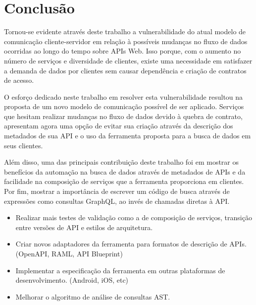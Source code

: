 \chapter{Conclusão}

Tornou-se evidente através deste trabalho a vulnerabilidade do atual modelo de comunicação cliente-servidor em relação à possíveis mudanças no fluxo de dados ocorridas ao longo do tempo sobre APIs Web. Isso porque, com o aumento no número de serviços e diversidade de clientes, existe uma necessidade em satisfazer a demanda de dados por clientes sem causar dependência e criação de contratos de acesso.

O esforço dedicado neste trabalho em resolver esta vulnerabilidade resultou na proposta de um novo modelo de comunicação possível de ser aplicado. Serviços que hesitam realizar mudanças no fluxo de dados devido à quebra de contrato, apresentam agora uma opção de evitar sua criação através da descrição dos metadados de sua API e o uso da ferramenta proposta para a busca de dados em seus clientes.

Além disso, uma das principais contribuição deste trabalho foi em mostrar os benefícios da automação na busca de dados através de metadados de APIs e da facilidade na composição de serviços que a ferramenta proporciona em clientes. Por fim, mostrar a importância de escrever um código de busca através de expressões como consultas GraphQL, ao invés de chamadas diretas à API.



\begin{itemize}
\item Realizar mais testes de validação como a de composição de serviços, transição entre versões de API e estilos de arquitetura.
\item Criar novos adaptadores da ferramenta para formatos de descrição de APIs. (OpenAPI, RAML, API Blueprint)
\item Implementar a especificação da ferramenta em outras plataformas de desenvolvimento. (Android, iOS, etc)
\item Melhorar o algoritmo de análise de consultas AST.
\end{itemize}
